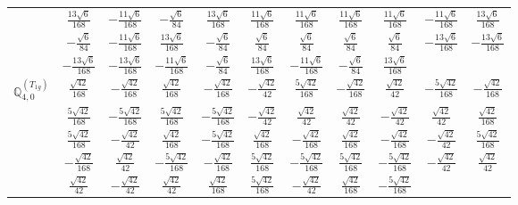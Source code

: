 \documentclass[fleqn,10pt,landscape]{article}
\begin{document}
\begin{itemize}
{\begin{center}
\begin{longtable}{ccccccccccc}
& $ \frac{13 \sqrt{6}}{168} $ & $ - \frac{11 \sqrt{6}}{168} $ & $ - \frac{\sqrt{6}}{84} $ & $ \frac{13 \sqrt{6}}{168} $ & $ \frac{11 \sqrt{6}}{168} $ & $ \frac{11 \sqrt{6}}{168} $ & $ \frac{11 \sqrt{6}}{168} $ & $ \frac{11 \sqrt{6}}{168} $ & $ - \frac{11 \sqrt{6}}{168} $ & $ \frac{13 \sqrt{6}}{168} $ \\
& $ - \frac{\sqrt{6}}{84} $ & $ - \frac{11 \sqrt{6}}{168} $ & $ \frac{13 \sqrt{6}}{168} $ & $ - \frac{\sqrt{6}}{84} $ & $ \frac{\sqrt{6}}{84} $ & $ \frac{\sqrt{6}}{84} $ & $ \frac{\sqrt{6}}{84} $ & $ \frac{\sqrt{6}}{84} $ & $ - \frac{13 \sqrt{6}}{168} $ & $ - \frac{13 \sqrt{6}}{168} $ \\
& $ - \frac{13 \sqrt{6}}{168} $ & $ - \frac{13 \sqrt{6}}{168} $ & $ - \frac{11 \sqrt{6}}{168} $ & $ - \frac{\sqrt{6}}{84} $ & $ \frac{13 \sqrt{6}}{168} $ & $ - \frac{11 \sqrt{6}}{168} $ & $ - \frac{\sqrt{6}}{84} $ & $ \frac{13 \sqrt{6}}{168} $ & $  $ & $  $ \\ \hline
$\mathbb{Q}_{4,0}^{(T_{1g})}$ & $ \frac{\sqrt{42}}{168} $ & $ - \frac{\sqrt{42}}{168} $ & $ \frac{\sqrt{42}}{168} $ & $ - \frac{\sqrt{42}}{168} $ & $ - \frac{\sqrt{42}}{42} $ & $ \frac{5 \sqrt{42}}{168} $ & $ - \frac{\sqrt{42}}{168} $ & $ \frac{\sqrt{42}}{42} $ & $ - \frac{5 \sqrt{42}}{168} $ & $ - \frac{\sqrt{42}}{168} $ \\
& $ \frac{5 \sqrt{42}}{168} $ & $ - \frac{5 \sqrt{42}}{168} $ & $ \frac{5 \sqrt{42}}{168} $ & $ - \frac{5 \sqrt{42}}{168} $ & $ - \frac{\sqrt{42}}{42} $ & $ \frac{\sqrt{42}}{42} $ & $ \frac{\sqrt{42}}{42} $ & $ - \frac{\sqrt{42}}{42} $ & $ \frac{\sqrt{42}}{42} $ & $ \frac{\sqrt{42}}{168} $ \\
& $ \frac{5 \sqrt{42}}{168} $ & $ - \frac{\sqrt{42}}{42} $ & $ \frac{\sqrt{42}}{168} $ & $ - \frac{5 \sqrt{42}}{168} $ & $ \frac{\sqrt{42}}{168} $ & $ - \frac{\sqrt{42}}{168} $ & $ \frac{\sqrt{42}}{168} $ & $ - \frac{\sqrt{42}}{168} $ & $ - \frac{\sqrt{42}}{42} $ & $ \frac{5 \sqrt{42}}{168} $ \\
& $ - \frac{\sqrt{42}}{168} $ & $ \frac{\sqrt{42}}{42} $ & $ - \frac{5 \sqrt{42}}{168} $ & $ - \frac{\sqrt{42}}{168} $ & $ \frac{5 \sqrt{42}}{168} $ & $ - \frac{5 \sqrt{42}}{168} $ & $ \frac{5 \sqrt{42}}{168} $ & $ - \frac{5 \sqrt{42}}{168} $ & $ - \frac{\sqrt{42}}{42} $ & $ \frac{\sqrt{42}}{42} $ \\
& $ \frac{\sqrt{42}}{42} $ & $ - \frac{\sqrt{42}}{42} $ & $ \frac{\sqrt{42}}{42} $ & $ \frac{\sqrt{42}}{168} $ & $ \frac{5 \sqrt{42}}{168} $ & $ - \frac{\sqrt{42}}{42} $ & $ \frac{\sqrt{42}}{168} $ & $ - \frac{5 \sqrt{42}}{168} $ & $  $ & $  $ \\ \hline

\end{longtable}
\end{center}}
\end{itemize}
\end{document}
